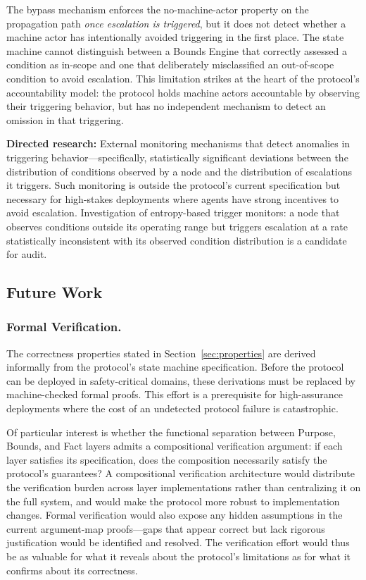 The bypass mechanism enforces the no-machine-actor property on the propagation path \emph{once escalation is triggered}, but it does not detect whether a machine actor has intentionally avoided triggering in the first place. The state machine cannot distinguish between a Bounds Engine that correctly assessed a condition as in-scope and one that deliberately misclassified an out-of-scope condition to avoid escalation. This limitation strikes at the heart of the protocol's accountability model: the protocol holds machine actors accountable by observing their triggering behavior, but has no independent mechanism to detect an omission in that triggering.

\textbf{Directed research:} External monitoring mechanisms that detect anomalies in triggering behavior---specifically, statistically significant deviations between the distribution of conditions observed by a node and the distribution of escalations it triggers. Such monitoring is outside the protocol's current specification but necessary for high-stakes deployments where agents have strong incentives to avoid escalation. Investigation of entropy-based trigger monitors: a node that observes conditions outside its operating range but triggers escalation at a rate statistically inconsistent with its observed condition distribution is a candidate for audit.

\subsection{Future Work}

\subsubsection{Formal Verification.}
The correctness properties stated in Section~\ref{sec:properties} are derived informally from the protocol's state machine specification. Before the protocol can be deployed in safety-critical domains, these derivations must be replaced by machine-checked formal proofs. This effort is a prerequisite for high-assurance deployments where the cost of an undetected protocol failure is catastrophic.

Of particular interest is whether the functional separation between Purpose, Bounds, and Fact layers admits a compositional verification argument: if each layer satisfies its specification, does the composition necessarily satisfy the protocol's guarantees? A compositional verification architecture would distribute the verification burden across layer implementations rather than centralizing it on the full system, and would make the protocol more robust to implementation changes. Formal verification would also expose any hidden assumptions in the current argument-map proofs---gaps that appear correct but lack rigorous justification would be identified and resolved. The verification effort would thus be as valuable for what it reveals about the protocol's limitations as for what it confirms about its correctness.

